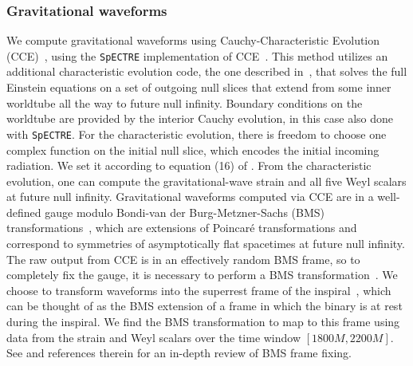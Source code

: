 \documentclass[12pt]{caltech_thesis}
\begin{document}
\begin{bibunit}[unsrtnat]
\subsubsection{Gravitational waveforms}
We compute gravitational waveforms using Cauchy-Characteristic Evolution
(CCE)~\cite{1996PhRvD..54.6153B,2016LRR....19....2B, 2016CQGra..33v5007H,
2020PhRvD.102b4004B, 2020PhRvD.102d4052M}, using the \texttt{SpECTRE}
implementation of CCE~\cite{Moxon:2021gbv}. This method utilizes an additional
characteristic evolution code, the one described in~\cite{Moxon:2021gbv}, that
solves the full Einstein equations on a set of outgoing null slices that extend
from some inner worldtube all the way to future null infinity.  Boundary
conditions on the worldtube are provided by the interior Cauchy evolution, in
this case also done with \texttt{SpECTRE}.  For the characteristic evolution,
there is freedom to choose one complex function on the initial null slice, which
encodes the initial incoming radiation. We set it according to equation (16) of
\cite{Moxon:2021gbv}. From the characteristic evolution, one can compute the
gravitational-wave strain and all five Weyl scalars at future null infinity.
Gravitational waveforms computed via CCE are in a well-defined gauge modulo
Bondi-van der Burg-Metzner-Sachs (BMS)
transformations~\cite{Bondi:1962px,Sachs:1962wk}, which are extensions of
Poincar\'e transformations and correspond to symmetries of asymptotically flat
spacetimes at future null infinity. The raw output from CCE is in an effectively
random BMS frame, so to completely fix the gauge, it is necessary to perform a
BMS transformation~\cite{Mitman:2024uss}.  We choose to transform waveforms into
the superrest frame of the inspiral~\cite{Mitman:2021xkq,Mitman:2022kwt}, which
can be thought of as the BMS extension of a frame in which the binary is at rest
during the inspiral. We find the BMS transformation to map to this frame using
data from the strain and Weyl scalars over the time window $[1800M,2200M]$. See
\cite{Mitman:2024uss} and references therein for an in-depth review of BMS frame
fixing.


\end{bibunit}
\end{document}
